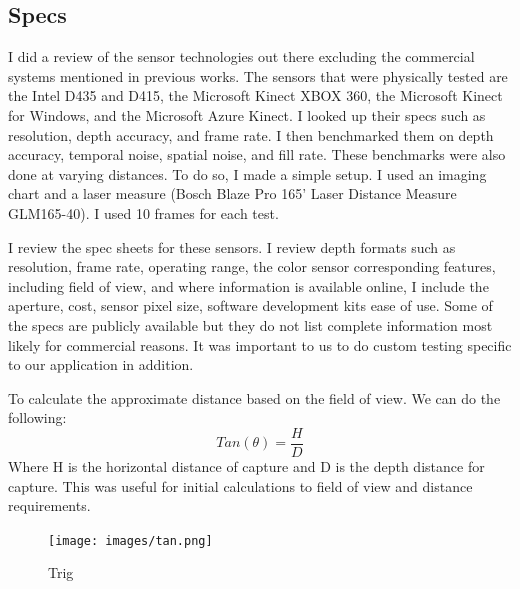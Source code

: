 \subsection{Specs}

I did a review of the sensor technologies out there excluding the commercial systems mentioned in previous works. The sensors that were physically tested are the Intel D435 and D415, the Microsoft Kinect XBOX 360, the Microsoft Kinect for Windows, and the Microsoft Azure Kinect. I looked up their specs such as resolution, depth accuracy, and frame rate. I then benchmarked them on depth accuracy, temporal noise, spatial noise, and fill rate. These benchmarks were also done at varying distances. To do so, I made a simple setup. I used an imaging chart and a laser measure (Bosch Blaze Pro 165' Laser Distance Measure GLM165-40). I used 10 frames for each test.

I review the spec sheets for these sensors. I review depth formats such as resolution, frame rate, operating range, the color sensor corresponding features, including field of view, and where information is available online, I include the aperture, cost, sensor pixel size, software development kits ease of use.
Some of the specs are publicly available but they do not list complete information most likely for commercial reasons. It was important to us to do custom testing specific to our application in addition.

To calculate the approximate distance based on the field of view. We can do the following:
\begin{equation}
	Tan(\theta) = \frac{H}{D}
\end{equation}
Where H is the horizontal distance of capture and D is the depth distance for capture. This was useful for initial calculations to field of view and distance requirements.
\begin{figure}[!htb]
	\caption{Trig}
	\centering
	\texttt{[image: images/tan.png]}
\end{figure}

